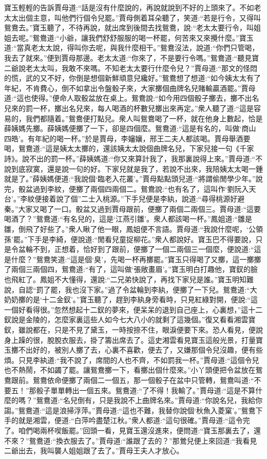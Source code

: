 \begin{parag}
    寶玉輕輕的告訴賈母道:“話是沒有什麼說的，再說就說到不好的上頭來了。不如老太太出個主意，叫他們行個令兒罷。”賈母側着耳朵聽了，笑道:“若是行令，又得叫鴛鴦去。”寶玉聽了，不待再說，就出席到後間去找鴛鴦，說:“老太太要行令，叫姐姐去呢。”鴛鴦道:“小爺，讓我們舒舒服服的喝一杯罷，何苦來又來攪什麼。”寶玉道:“當真老太太說，得叫你去呢，與我什麼相干。”鴛鴦沒法，說道:“你們只管喝，我去了就來。”便到賈母那邊。老太太道:“你來了，不是要行令嗎。”鴛鴦道:“聽見寶二爺說老太太叫，我敢不來嗎。不知老太太要行什麼令兒？”賈母道:“那文的怪悶的慌，武的又不好，你倒是想個新鮮頑意兒纔好。”鴛鴦想了想道:“如今姨太太有了年紀，不肯費心，倒不如拿出令盤骰子來，大家擲個曲牌名兒賭輸贏酒罷。”賈母道:“這也使得。”便命人取骰盆放在桌上。鴛鴦說:“如今用四個骰子擲去，擲不出名兒來的罰一杯，擲出名兒來，每人喝酒的杯數兒擲出來再定。”衆人聽了道:“這是容易的，我們都隨着。”鴛鴦便打點兒。衆人叫鴛鴦喝了一杯，就在他身上數起，恰是薛姨媽先擲。薛姨媽便擲了一下，卻是四個麼。鴛鴦道:“這是有名的，叫做‘商山四皓’。有年紀的喝一杯。”於是賈母，李嬸孃，邢王二夫人都該喝。賈母舉酒要喝，鴛鴦道:“這是姨太太擲的，還該姨太太說個曲牌名兒，下家兒接一句《千家詩》。說不出的罰一杯。”薛姨媽道:“你又來算計我了，我那裏說得上來。”賈母道:“不說到底寂寞，還是說一句的好。下家兒就是我了，若說不出來，我陪姨太太喝一鍾就是了。”薛姨媽便道:“我說個‘臨老入花叢’。”賈母點點頭兒道:“將謂偷閒學少年。”說完，骰盆過到李紋，便擲了兩個四兩個二。鴛鴦說:“也有名了，這叫作‘劉阮入天台’。”李紋便接着說了個”二士入桃源。”下手兒便是李紈，說道:“尋得桃源好避秦。”大家又喝了一口。骰盆又過到賈母跟前，便擲了兩個二兩個三。賈母道:“這要喝酒了？”鴛鴦道:“有名兒的，這是‘江燕引雛’。衆人都該喝一杯。”鳳姐道:“雛是雛，倒飛了好些了。”衆人瞅了他一眼，鳳姐便不言語。賈母道:“我說什麼呢，‘公領孫’罷。”下手是李綺，便說道:“閒看兒童捉柳花。”衆人都說好。寶玉巴不得要說，只是令盆輪不到，正想着，恰好到了跟前，便擲了一個二兩個三一個麼，便說道:“這是什麼？”鴛鴦笑道:“這是個‘臭’，先喝一杯再擲罷。”寶玉只得喝了又擲，這一擲擲了兩個三兩個四，鴛鴦道:“有了，這叫做‘張敞畫眉’。”寶玉明白打趣他，寶釵的臉也飛紅了。鳳姐不大懂得，還說:“二兄弟快說了，再找下家兒是誰。”寶玉明知難說，自認“罰了罷，我也沒下家。”過了令盆輪到李紈，便擲了一下兒。鴛鴦道:“大奶奶擲的是‘十二金釵’。”寶玉聽了，趕到李紈身旁看時，只見紅綠對開，便說:“這一個好看得很。”忽然想起十二釵的夢來，便呆呆的退到自己座上，心裏想，”這十二釵說是金陵的，怎麼家裏這些人如今七大八小的就剩了這幾個。”復又看看湘雲寶釵，雖說都在，只是不見了黛玉，一時按捺不住，眼淚便要下來。恐人看見，便說身上躁的很，脫脫衣服去，掛了籌出席去了。這史湘雲看見寶玉這般光景，打量寶玉擲不出好的，被別人擲了去，心裏不喜歡，便去了，又嫌那個令兒沒趣，便有些煩。只見李紈道:“我不說了，席間的人也不齊，不如罰我一杯。”賈母道:“這個令兒也不熱鬧，不如蠲了罷。讓鴛鴦擲一下，看擲出個什麼來。”小丫頭便把令盆放在鴛鴦跟前。鴛鴦依命便擲了兩個二一個五，那一個骰子在盆中只管轉，鴛鴦叫道:“不要五！”那骰子單單轉出一個五來。鴛鴦道:“了不得！我輸了。”賈母道:“這是不算什麼的嗎？”鴛鴦道:“名兒倒有，只是我說不上曲牌名來。”賈母道:“你說名兒，我給你謅。”鴛鴦道:“這是浪掃浮萍。”賈母道:“這也不難，我替你說個‘秋魚入菱窠’。”鴛鴦下手的就是湘雲，便道:“白萍吟盡楚江秋。”衆人都道:“這句很確。”賈母道:“這令完了。咱們喝兩杯喫飯罷。”回頭一看，見寶玉還沒進來，便問道:“寶玉那裏去了，還不來？”鴛鴦道:“換衣服去了。”賈母道:“誰跟了去的？”那鶯兒便上來回道:“我看見二爺出去，我叫襲人姐姐跟了去了。”賈母王夫人才放心。

\end{parag}
